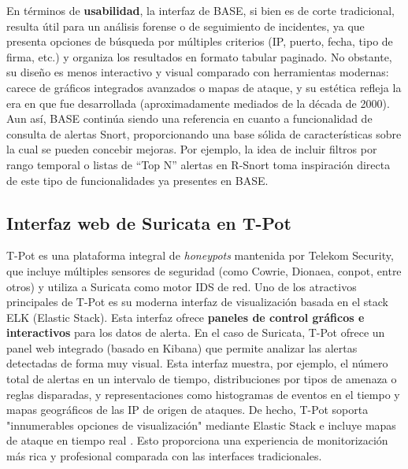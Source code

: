 \documentclass[11pt,a4paper,twoside]{report}
\begin{document}
En términos de \textbf{usabilidad}, la interfaz de BASE, si bien es de corte tradicional, resulta útil para un análisis forense o de seguimiento de incidentes, ya que presenta opciones de búsqueda por múltiples criterios (IP, puerto, fecha, tipo de firma, etc.) y organiza los resultados en formato tabular paginado. No obstante, su diseño es menos interactivo y visual comparado con herramientas modernas: carece de gráficos integrados avanzados o mapas de ataque, y su estética refleja la era en que fue desarrollada (aproximadamente mediados de la década de 2000). Aun así, BASE continúa siendo una referencia en cuanto a funcionalidad de consulta de alertas Snort, proporcionando una base sólida de características sobre la cual se pueden concebir mejoras. Por ejemplo, la idea de incluir filtros por rango temporal o listas de “Top N” alertas en R-Snort toma inspiración directa de este tipo de funcionalidades ya presentes en BASE.

\subsection{Interfaz web de Suricata en T-Pot}
T-Pot es una plataforma integral de \emph{honeypots} mantenida por Telekom Security, que incluye múltiples sensores de seguridad (como Cowrie, Dionaea, conpot, entre otros) y utiliza a Suricata como motor IDS de red. Uno de los atractivos principales de T-Pot es su moderna interfaz de visualización basada en el stack ELK (Elastic Stack). Esta interfaz ofrece \textbf{paneles de control gráficos e interactivos} para los datos de alerta. En el caso de Suricata, T-Pot ofrece un panel web integrado (basado en Kibana) que permite analizar las alertas detectadas de forma muy visual. Esta interfaz muestra, por ejemplo, el número total de alertas en un intervalo de tiempo, distribuciones por tipos de amenaza o reglas disparadas, y representaciones como histogramas de eventos en el tiempo y mapas geográficos de las IP de origen de ataques. De hecho, T-Pot soporta "innumerables opciones de visualización" mediante Elastic Stack e incluye mapas de ataque en tiempo real \cite{tpot}. Esto proporciona una experiencia de monitorización más rica y profesional comparada con las interfaces tradicionales.\newline
\end{document}
